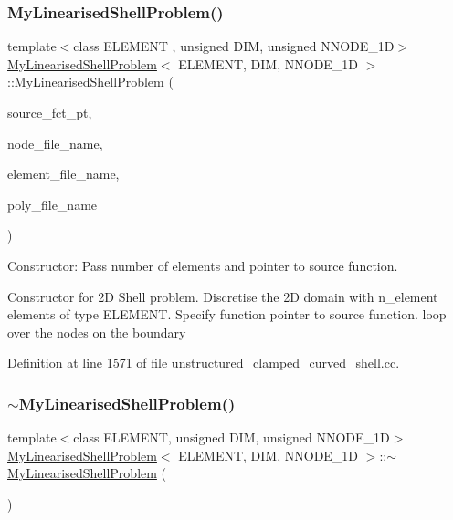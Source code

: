 \subsubsection{\texorpdfstring{My\+Linearised\+Shell\+Problem()}{MyLinearisedShellProblem()}}
{\footnotesize\ttfamily template$<$class E\+L\+E\+M\+E\+NT , unsigned D\+IM, unsigned N\+N\+O\+D\+E\+\_\+1D$>$ \\
\hyperlink{classMyLinearisedShellProblem}{My\+Linearised\+Shell\+Problem}$<$ E\+L\+E\+M\+E\+NT, D\+IM, N\+N\+O\+D\+E\+\_\+1D $>$\+::\hyperlink{classMyLinearisedShellProblem}{My\+Linearised\+Shell\+Problem} (\begin{DoxyParamCaption}\item[{typename \hyperlink{classoomph_1_1MyShellEquations}{My\+Shell\+Equations}$<$ D\+IM, N\+N\+O\+D\+E\+\_\+1D $>$\+::Source\+Fct\+Pt}]{source\+\_\+fct\+\_\+pt,  }\item[{const string \&}]{node\+\_\+file\+\_\+name,  }\item[{const string \&}]{element\+\_\+file\+\_\+name,  }\item[{const string \&}]{poly\+\_\+file\+\_\+name }\end{DoxyParamCaption})}



Constructor\+: Pass number of elements and pointer to source function. 

Constructor for 2D Shell problem. Discretise the 2D domain with n\+\_\+element elements of type E\+L\+E\+M\+E\+NT. Specify function pointer to source function. loop over the nodes on the boundary 

Definition at line 1571 of file unstructured\+\_\+clamped\+\_\+curved\+\_\+shell.\+cc.

\mbox{\label{classMyLinearisedShellProblem_a8720e7226adb9f23266fe729f7e4eb5a}} 
\subsubsection{\texorpdfstring{$\sim$\+My\+Linearised\+Shell\+Problem()}{~MyLinearisedShellProblem()}}
{\footnotesize\ttfamily template$<$class E\+L\+E\+M\+E\+NT, unsigned D\+IM, unsigned N\+N\+O\+D\+E\+\_\+1D$>$ \\
\hyperlink{classMyLinearisedShellProblem}{My\+Linearised\+Shell\+Problem}$<$ E\+L\+E\+M\+E\+NT, D\+IM, N\+N\+O\+D\+E\+\_\+1D $>$\+::$\sim$\hyperlink{classMyLinearisedShellProblem}{My\+Linearised\+Shell\+Problem} (\begin{DoxyParamCaption}{ }\end{DoxyParamCaption})\hspace{0.3cm}{\ttfamily [inline]}}



